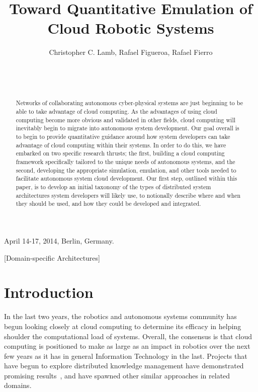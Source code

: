 \documentclass{sig-alternate}
\begin{document}
\title{Toward Quantitative Emulation of Cloud Robotic Systems}


\author{
\alignauthor
Christopher C. Lamb, Rafael Figueroa, Rafael Fierro\\
       \\
       \\
       \\
}

 {April 14-17, 2014, Berlin, Germany.} 

\maketitle

\begin{abstract}
Networks of collaborating autonomous cyber-physical systems are just beginning to be able to take advantage of cloud computing.  As the advantages of using cloud computing become more obvious and validated in other fields, cloud computing will inevitably begin to migrate into autonomous system development.  Our goal overall is to begin to provide quantitative guidance around how system developers can take advantage of cloud computing within their systems.  In order to do this, we have embarked on two specific research thrusts; the first, building a cloud computing framework specifically tailored to the unique needs of autonomous systems, and the second, developing the appropriate simulation, emulation, and other tools needed to facilitate autonomous system cloud development.  Our first step, outlined within this paper, is to develop an initial taxonomy of the types of distributed system architectures system developers will likely use, to notionally describe where and when they should be used, and how they could be developed and integrated.
\end{abstract}

[Domain-specific Architectures]

\section{Introduction}
In the last two years, the robotics and autonomous systems community has begun looking closely at cloud computing to determine its efficacy in helping shoulder the computational load of systems.  Overall, the consensus is that cloud computing is positioned to make as large as an impact in robotics over the next few years as it has in general Information Technology in the last.  Projects that have begun to explore distributed knowledge management have demonstrated promising results~\cite{TeKlPaBe:11, TePeLaBe:12, WaBeCiDa:11}, and have spawned other similar approaches in related domains.
\end{document}
